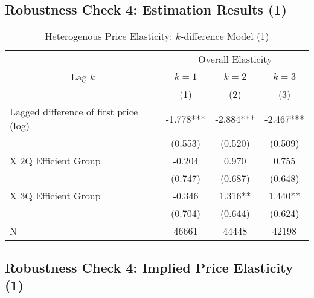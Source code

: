 \documentclass[ review  , 3p ]{elsarticle}
\begin{document}
  \hypertarget{robustness-check-4-estimation-results-1}{%
  \subsection{Robustness Check 4: Estimation Results (1)}\label{robustness-check-4-estimation-results-1}}
  
  \begin{table}
  
  \caption{\label{tab:kableHeterokDiffElasticitySlide1}Heterogenous Price Elasticity: $k$-difference Model (1)}
  \centering
  \fontsize{8}{10}\selectfont
  \begin{tabular}[t]{lccc}
  \toprule
  \multicolumn{1}{c}{ } & \multicolumn{3}{c}{Overall Elasticity} \\
  \cmidrule(l{3pt}r{3pt}){2-4}
  \multicolumn{1}{c}{Lag $k$} & \multicolumn{1}{c}{$k = 1$} & \multicolumn{1}{c}{$k = 2$} & \multicolumn{1}{c}{$k = 3$} \\
  \cmidrule(l{3pt}r{3pt}){1-1} \cmidrule(l{3pt}r{3pt}){2-2} \cmidrule(l{3pt}r{3pt}){3-3} \cmidrule(l{3pt}r{3pt}){4-4}
   & (1) & (2) & (3)\\
  \midrule
  Lagged difference of first price (log) & -1.778*** & -2.884*** & -2.467***\\
   & (0.553) & (0.520) & (0.509)\\
  \hspace{1em}X 2Q Efficient Group & -0.204 & 0.970 & 0.755\\
   & (0.747) & (0.687) & (0.648)\\
  \hspace{1em}X 3Q Efficient Group & -0.346 & 1.316** & 1.440**\\
   & (0.704) & (0.644) & (0.624)\\
  N & 46661 & 44448 & 42198\\
  \bottomrule
  \end{tabular}
  \end{table}
  
  \hypertarget{robustness-check-4-implied-price-elasticity-1}{%
  \subsection{Robustness Check 4: Implied Price Elasticity (1)}\label{robustness-check-4-implied-price-elasticity-1}}
  
\end{document}
